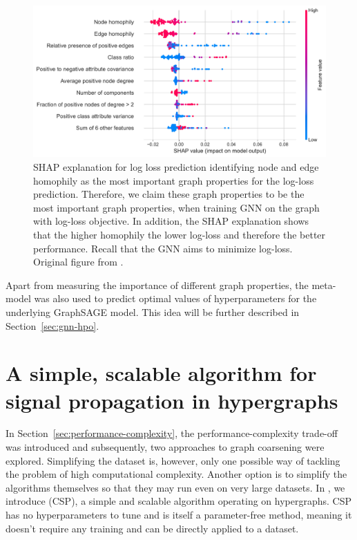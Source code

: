 \begin{figure}
	\includegraphics[width=\linewidth]{images/graph-property-importance.pdf}
	\caption{SHAP explanation for log loss prediction identifying node and edge homophily as the most important graph properties for the log-loss prediction. Therefore, we claim these graph properties to be the most important graph properties, when training GNN on the graph with log-loss objective. In addition, the SHAP explanation shows that the higher homophily the lower log-loss and therefore the better performance. Recall that the GNN aims to minimize log-loss. Original figure from \cite{prochazka_which_2023}.}
	\label{fig:graph-property-importance}
\end{figure}

Apart from measuring the importance of different graph properties, the meta-model was also used to predict optimal values of hyperparameters for the underlying GraphSAGE model. This idea will be further described in Section~\ref{sec:gnn-hpo}.

\section{A simple, scalable algorithm for signal propagation in hypergraphs}

In Section~\ref{sec:performance-complexity}, the performance-complexity trade-off was introduced and subsequently, two approaches to graph coarsening were explored. Simplifying the dataset is, however, only one possible way of tackling the problem of high computational complexity. Another option is to simplify the algorithms themselves so that they may run even on very large datasets. In \cite{prochazka_convolutional_2024}, we introduce  (CSP), a simple and scalable algorithm operating on hypergraphs. CSP has no hyperparameters to tune and is itself a parameter-free method, meaning it doesn't require any training and can be directly applied to a dataset.

